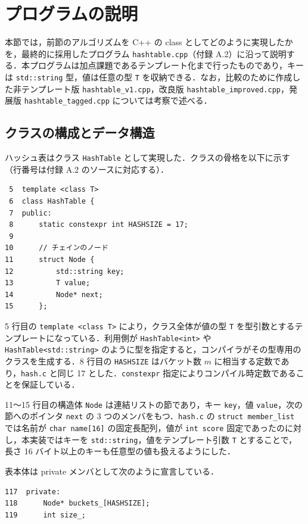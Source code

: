 \section{プログラムの説明}

本節では，前節のアルゴリズムを C++ の class としてどのように実現したかを，最終的に採用したプログラム {\tt hashtable.cpp}（付録 A.2）に沿って説明する．本プログラムは加点課題であるテンプレート化まで行ったものであり，キーは {\tt std::string} 型，値は任意の型 {\tt T} を収納できる．なお，比較のために作成した非テンプレート版 {\tt hashtable\_v1.cpp}，改良版 {\tt hashtable\_improved.cpp}，発展版 {\tt hashtable\_tagged.cpp} については考察で述べる．

\subsection{クラスの構成とデータ構造}

ハッシュ表はクラス {\tt HashTable} として実現した．クラスの骨格を以下に示す（行番号は付録 A.2 のソースに対応する）．

\begin{verbatim}
 5  template <class T>
 6  class HashTable {
 7  public:
 8      static constexpr int HASHSIZE = 17;
 9
10      // チェインのノード
11      struct Node {
12          std::string key;
13          T value;
14          Node* next;
15      };
\end{verbatim}

5 行目の {\tt template <class T>} により，クラス全体が値の型 {\tt T} を型引数とするテンプレートになっている．利用側が {\tt HashTable<int>} や {\tt HashTable<std::string>} のように型を指定すると，コンパイラがその型専用のクラスを生成する．8 行目の {\tt HASHSIZE} はバケット数 $m$ に相当する定数であり，{\tt hash.c} と同じ 17 とした．{\tt constexpr} 指定によりコンパイル時定数であることを保証している．

11〜15 行目の構造体 {\tt Node} は連結リストの節であり，キー {\tt key}，値 {\tt value}，次の節へのポインタ {\tt next} の 3 つのメンバをもつ．{\tt hash.c} の {\tt struct member\_list} では名前が {\tt char name[16]} の固定長配列，値が {\tt int score} 固定であったのに対し，本実装ではキーを {\tt std::string}，値をテンプレート引数 {\tt T} とすることで，長さ 16 バイト以上のキーも任意型の値も扱えるようにした．

表本体は private メンバとして次のように宣言している．

\begin{verbatim}
117  private:
118      Node* buckets_[HASHSIZE];
119      int size_;
\end{verbatim}

